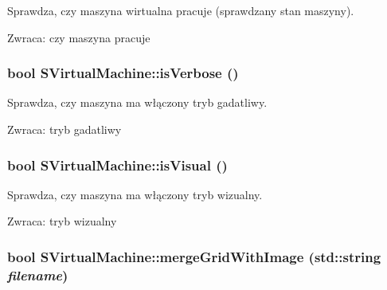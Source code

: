 Sprawdza, czy maszyna wirtualna pracuje (sprawdzany stan maszyny). \begin{Desc}
\item[Zwraca:]czy maszyna pracuje \end{Desc}
\hypertarget{classSVirtualMachine_38d1e09d68d418ce34ae46d6a9dbb6dd}{
\subsubsection[{isVerbose}]{\setlength{\rightskip}{0pt plus 5cm}bool SVirtualMachine::isVerbose ()}}
\label{classSVirtualMachine_38d1e09d68d418ce34ae46d6a9dbb6dd}


Sprawdza, czy maszyna ma włączony tryb gadatliwy. \begin{Desc}
\item[Zwraca:]tryb gadatliwy \end{Desc}
\hypertarget{classSVirtualMachine_e8c66ecac57d97346c24fd98c3736c2e}{
\subsubsection[{isVisual}]{\setlength{\rightskip}{0pt plus 5cm}bool SVirtualMachine::isVisual ()}}
\label{classSVirtualMachine_e8c66ecac57d97346c24fd98c3736c2e}


Sprawdza, czy maszyna ma włączony tryb wizualny. \begin{Desc}
\item[Zwraca:]tryb wizualny \end{Desc}
\hypertarget{classSVirtualMachine_0257c841ecfbb17f2c85ffd2d8764de8}{
\subsubsection[{mergeGridWithImage}]{\setlength{\rightskip}{0pt plus 5cm}bool SVirtualMachine::mergeGridWithImage (std::string {\em filename})}}
\label{classSVirtualMachine_0257c841ecfbb17f2c85ffd2d8764de8}


